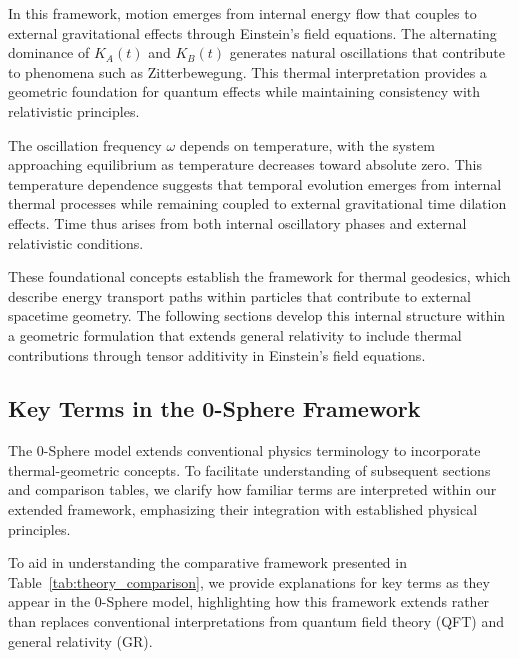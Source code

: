 \documentclass[%
 reprint,
 amsmath,amssymb,
 aps,
]{revtex4-1}
\numberwithin{equation}{section}%
\begin{document}
In this framework, motion emerges from internal energy flow that couples to external gravitational effects through Einstein's field equations. The alternating dominance of $K_A(t)$ and $K_B(t)$ generates natural oscillations that contribute to phenomena such as Zitterbewegung. This thermal interpretation provides a geometric foundation for quantum effects while maintaining consistency with relativistic principles.

The oscillation frequency $\omega$ depends on temperature, with the system approaching equilibrium as temperature decreases toward absolute zero. This temperature dependence suggests that temporal evolution emerges from internal thermal processes while remaining coupled to external gravitational time dilation effects. Time thus arises from both internal oscillatory phases and external relativistic conditions.

These foundational concepts establish the framework for thermal geodesics, which describe energy transport paths within particles that contribute to external spacetime geometry. The following sections develop this internal structure within a geometric formulation that extends general relativity to include thermal contributions through tensor additivity in Einstein's field equations.

\subsection{Key Terms in the 0-Sphere Framework}

The 0-Sphere model extends conventional physics terminology to incorporate thermal-geometric concepts. To facilitate understanding of subsequent sections and comparison tables, we clarify how familiar terms are interpreted within our extended framework, emphasizing their integration with established physical principles.

To aid in understanding the comparative framework presented in Table~\ref{tab:theory_comparison}, we provide explanations for key terms as they appear in the 0-Sphere model, highlighting how this framework extends rather than replaces conventional interpretations from quantum field theory (QFT) and general relativity (GR).
\end{document}
